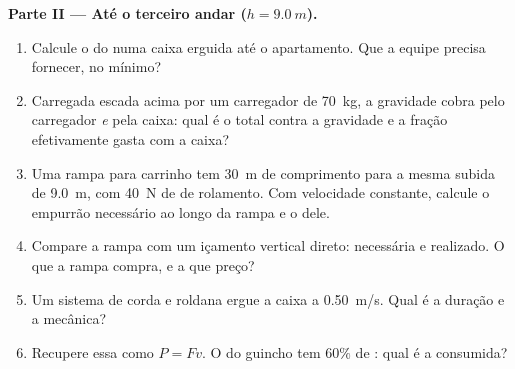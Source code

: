 \begin{problem}
\medskip
\noindent\textbf{Parte II --- Até o terceiro andar ($h = \qty{9.0}{m}$).}
\begin{enumerate}[resume]
  \item Calcule o  do  numa caixa erguida até o apartamento.
        Que  a equipe precisa fornecer, no mínimo?
  \item Carregada escada acima por um carregador de \qty{70}{kg}, a
        gravidade cobra pelo carregador \emph{e} pela caixa: qual é o
         total contra a gravidade e a fração efetivamente gasta
        com a caixa?
  \item Uma rampa para carrinho tem \qty{30}{m} de comprimento para a
        mesma subida de \qty{9.0}{m}, com \qty{40}{N} de  de
        rolamento. Com velocidade constante, calcule o empurrão
        necessário ao longo da rampa e o  dele.
  \item Compare a rampa com um içamento vertical direto: 
        necessária e  realizado. O que a rampa compra, e a que
        preço?
  \item Um sistema de corda e roldana ergue a caixa a \qty{0.50}{m/s}.
        Qual é a duração e a  mecânica?
  \item Recupere essa  como $P = Fv$. O  do guincho tem
        $60\%$ de : qual é a  consumida?
\end{enumerate}


\end{problem}
